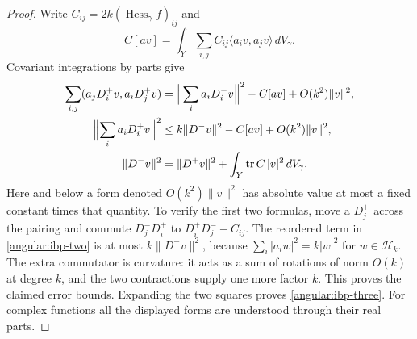 \documentclass[11pt]{article}
\theoremstyle{definition}
\theoremstyle{remark}
\DeclareMathOperator{\tr}{tr}
\numberwithin{equation}{section}
\begin{document}
\begin{proof}
Write $C_{ij}=2k(\operatorname{Hess}_\gamma f)_{ij}$ and
\[
 C[av]=\int_Y\sum_{i,j}C_{ij}\langle a_iv,a_jv\rangle\,dV_\gamma.
\]
Covariant integrations by parts give
\begin{align}
 \sum_{i,j}(a_jD_i^+v,a_iD_j^+v)
   &=\Bigl\|\sum_i a_iD_i^-v\Bigr\|^2-C[av]
                                    +O(k^2)\|v\|^2,\label{angular:ibp-one}\\
 \Bigl\|\sum_i a_iD_i^+v\Bigr\|^2
   &\le k\|D^-v\|^2-C[av]+O(k^2)\|v\|^2,\label{angular:ibp-two}\\
 \|D^-v\|^2
   &=\|D^+v\|^2+\int_Y\tr C\,|v|^2\,dV_\gamma.
                                                    \label{angular:ibp-three}
\end{align}
Here and below a form denoted $O(k^2)\|v\|^2$ has absolute value at most
a fixed constant times that quantity.  To verify the first two formulas,
move a $D_j^+$ across the pairing and commute
$D_j^-D_i^+$ to $D_i^+D_j^--C_{ij}$.  The reordered term in
\eqref{angular:ibp-two} is at most $k\|D^-v\|^2$, because
$\sum_i|a_iw|^2=k|w|^2$ for $w\in\mathcal H_k$.
The extra commutator is curvature: it acts as a sum of rotations of norm
$O(k)$ at degree $k$, and the two contractions supply one more factor $k$.
This proves the claimed error bounds.  Expanding the two squares proves
\eqref{angular:ibp-three}.  For complex functions all the displayed forms
are understood through their real parts.


\end{proof}
\end{document}
